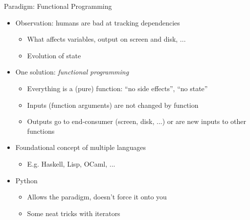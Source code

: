 
\begin{frame}[fragile]{Paradigm: Functional Programming}
%
\begin{itemize}
\item Observation: humans are bad at tracking dependencies
	\begin{itemize}
	\item What affects variables, output on screen and disk, ...
	\item[\Thus] Evolution of state
	\end{itemize}
\item One solution: \emph{functional programming}
	\begin{itemize}
	\item Everything is a (pure) function: \enquote{no side effects}, \enquote{no state}
	\item Inputs (\ie function arguments) are not changed by function
	\item Outputs go to end-consumer (screen, disk, ...) or are new inputs to other functions
	\end{itemize}
\item Foundational concept of multiple languages
	\begin{itemize}
	\item E.\;g. Haskell, Lisp, OCaml, ...
	\end{itemize}
\item Python
	\begin{itemize}
	\item Allows the paradigm, doesn't force it onto you
	\item Some neat tricks with iterators
	\end{itemize}
\end{itemize}
%
\end{frame}


